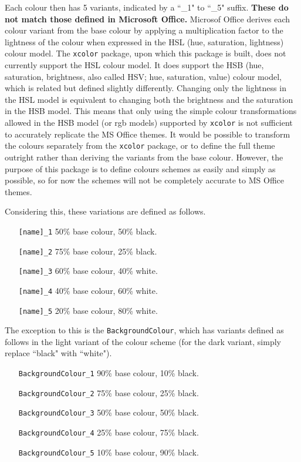 \documentclass[]{article}
\begin{document}
  Each colour then has 5 variants, indicated by a ``\_1" to ``\_5" suffix. \textbf{These do not match those defined in Microsoft Office.} Microsof Office derives each colour variant from the base colour by applying a multiplication factor to the lightness of the colour when expressed in the HSL (hue, saturation, lightness) colour model. The \texttt{xcolor} package, upon which this package is built, does not currently support the HSL colour model. It does support the HSB (hue, saturation, brightness, also called HSV; hue, saturation, value) colour model, which is related but defined slightly differently. Changing only the lightness in the HSL model is equivalent to changing both the brightness and the saturation in the HSB model. This means that only using the simple colour transformations allowed in the HSB model (or rgb models) supported by \texttt{xcolor} is not sufficient to accurately replicate the MS Office themes. It would be possible to transform the colours separately from the \texttt{xcolor} package, or to define the full theme outright rather than deriving the variants from the base colour. However, the purpose of this package is to define colours schemes as easily and simply as possible, so for now the schemes will not be completely accurate to MS Office themes.

  Considering this, these variations are defined as follows.

  \begin{itemize}[leftmargin = 1.75in, labelsep = 0.75cm]
    \item[\texttt{[name]\_1}] 50\% base colour, 50\% black.
    \item[\texttt{[name]\_2}] 75\% base colour, 25\% black.
    \item[\texttt{[name]\_3}] 60\% base colour, 40\% white.
    \item[\texttt{[name]\_4}] 40\% base colour, 60\% white.
    \item[\texttt{[name]\_5}] 20\% base colour, 80\% white.
  \end{itemize}

  The exception to this is the \texttt{BackgroundColour}, which has variants defined as follows in the light variant of the colour scheme (for the dark variant, simply replace ``black" with ``white").

  \begin{itemize}[leftmargin = 1.75in, labelsep = 0.75cm]
    \item[\texttt{BackgroundColour\_1}] 90\% base colour, 10\% black.
    \item[\texttt{BackgroundColour\_2}] 75\% base colour, 25\% black.
    \item[\texttt{BackgroundColour\_3}] 50\% base colour, 50\% black.
    \item[\texttt{BackgroundColour\_4}] 25\% base colour, 75\% black.
    \item[\texttt{BackgroundColour\_5}] 10\% base colour, 90\% black.
  \end{itemize}
\end{document}
